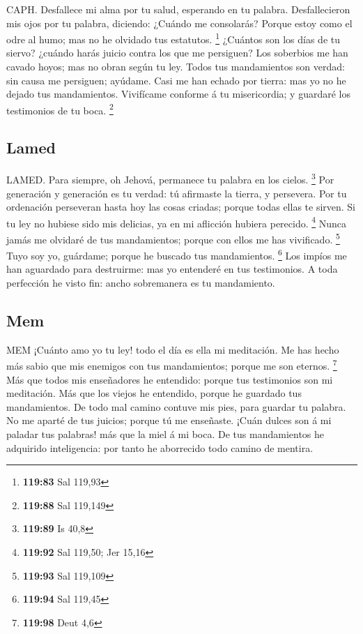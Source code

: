  CAPH. Desfallece mi alma por tu salud, esperando en tu
palabra.  Desfallecieron mis ojos por tu palabra, diciendo:
¿Cuándo me consolarás?  Porque estoy como el odre al humo;
mas no he olvidado tus estatutos. \footnote{\textbf{119:83} Sal 119,93}
 ¿Cuántos son los días de tu siervo? ¿cuándo harás juicio
contra los que me persiguen?  Los soberbios me han cavado
hoyos; mas no obran según tu ley.  Todos tus mandamientos
son verdad: sin causa me persiguen; ayúdame.  Casi me han
echado por tierra: mas yo no he dejado tus mandamientos. 
Vivifícame conforme á tu misericordia; y guardaré los testimonios de tu
boca. \footnote{\textbf{119:88} Sal 119,149}

\hypertarget{lamed}{%
\subsection{Lamed}\label{lamed}}

 LAMED. Para siempre, oh Jehová, permanece tu palabra en
los cielos. \footnote{\textbf{119:89} Is 40,8}  Por
generación y generación es tu verdad: tú afirmaste la tierra, y
persevera.  Por tu ordenación perseveran hasta hoy las
cosas criadas; porque todas ellas te sirven.  Si tu ley no
hubiese sido mis delicias, ya en mi aflicción hubiera perecido.
\footnote{\textbf{119:92} Sal 119,50; Jer 15,16}  Nunca
jamás me olvidaré de tus mandamientos; porque con ellos me has
vivificado. \footnote{\textbf{119:93} Sal 119,109}  Tuyo
soy yo, guárdame; porque he buscado tus mandamientos. \footnote{\textbf{119:94}
  Sal 119,45}  Los impíos me han aguardado para destruirme:
mas yo entenderé en tus testimonios.  A toda perfección he
visto fin: ancho sobremanera es tu mandamiento.

\hypertarget{mem}{%
\subsection{Mem}\label{mem}}

 MEM ¡Cuánto amo yo tu ley! todo el día es ella mi
meditación.  Me has hecho más sabio que mis enemigos con
tus mandamientos; porque me son eternos. \footnote{\textbf{119:98} Deut
  4,6}  Más que todos mis enseñadores he entendido: porque
tus testimonios son mi meditación.  Más que los viejos he
entendido, porque he guardado tus mandamientos.  De todo
mal camino contuve mis pies, para guardar tu palabra.  No
me aparté de tus juicios; porque tú me enseñaste.  ¡Cuán
dulces son á mi paladar tus palabras! más que la miel á mi boca.
 De tus mandamientos he adquirido inteligencia: por tanto
he aborrecido todo camino de mentira.

